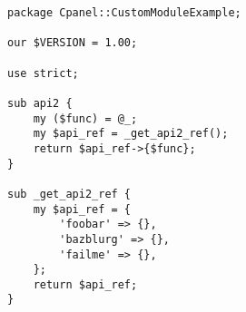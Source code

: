\begin{verbatim}
package Cpanel::CustomModuleExample;

our $VERSION = 1.00;

use strict;

sub api2 {
    my ($func) = @_;
    my $api_ref = _get_api2_ref();
    return $api_ref->{$func};
}

sub _get_api2_ref {
    my $api_ref = {
        'foobar' => {},
        'bazblurg' => {},
        'failme' => {},
    };
    return $api_ref;
}
\end{verbatim}

